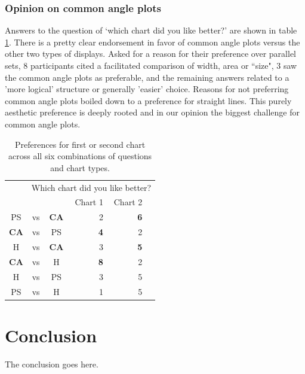 \subsubsection{Opinion on common angle plots}
Answers to the question of `which chart did you like better?' are shown in table \ref{tab:prefer}. There is a pretty clear endorsement in favor of common angle plots versus the other two types of displays.
Asked for a reason for their preference over parallel sets, 8 participants cited a facilitated comparison of width, area or ``size", 3 saw the common angle plots as preferable, and the remaining answers related to a 'more logical' structure or generally 'easier' choice.
Reasons for not preferring common angle plots boiled down to a preference for straight lines. This purely aesthetic preference is deeply rooted and in our opinion the biggest challenge for common angle plots.
\begin{table}[ht]
\begin{center}
\begin{tabular}{cccrrr}
  \hline
&\multicolumn{5}{r}{Which chart did you like better?}\\
&&& Chart 1 &  Chart 2 \\ 
  \hline
  PS &vs&  {\bf CA} & 2 & \bf 6 \\ 
 {\bf  CA} & vs &  PS & \bf 4 & 2 \\ 
  H & vs &   {\bf  CA} & 3 & \bf 5 \\ 
   {\bf  CA} & vs &  H & \bf 8 & 2 \\ 
  H & vs &  PS & 3 & 5 \\ 
  PS & vs &  H & 1 & 5 \\ 
   \hline
\end{tabular}
\caption{\label{tab:prefer} Preferences for first or second chart across all six combinations of questions and chart types. }
\vspace{-0.3in}
\end{center}
\end{table}

\section{Conclusion}
The conclusion goes here.






